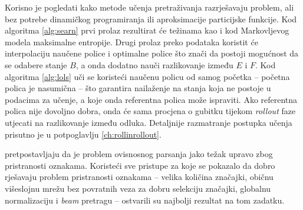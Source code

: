 Korisno je pogledati kako metode učenja pretraživanja razrješavaju problem, ali
bez potrebe dinamičkog programiranja ili aproksimacije particijske funkcije. Kod
algoritma \ref{alg:searn} prvi prolaz rezultirat će težinama kao i kod
Markovljevog modela maksimalne entropije. Drugi prolaz preko podataka koristit
će interpolaciju naučene police i optimalne police što znači da postoji
mogućnost da se odabere stanje $B$, a onda dodatno nauči razlikovanje između $E$
i $F$. Kod algoritma \ref{alg:lols} uči se koristeći naučenu policu od samog
početka -- početna polica je nasumična -- što garantira nailaženje na stanja
koja ne postoje u podacima za učenje, a koje onda referentna polica može
ispraviti. Ako referentna polica nije dovoljno dobra, onda će sama procjena o
gubitku tijekom \textit{rollout} faze utjecati na razlikovanje između odluka.
Detaljnije razmatranje postupka učenja prisutno je u potpoglavlju
\ref{ch:rollinrollout}.

\citet{andor2016globally} pretpostavljaju da je problem ovisnosnog parsanja jako
težak upravo zbog pristranosti oznakama. Koristeći sve pristupe za koje se
pokazalo da dobro rješavaju problem pristranosti oznakama -- velika količina
značajki, običnu višeslojnu mrežu bez povratnih veza za dobru selekciju
značajki, globalnu normalizaciju i \textit{beam} pretragu -- ostvarili su
najbolji rezultat na tom zadatku.

